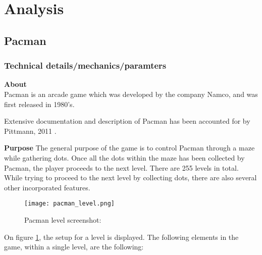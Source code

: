 
\section{Analysis} \label{sec:analysis}




\subsection{Pacman}

\subsubsection{Technical details/mechanics/paramters}

\textbf{About}\\
Pacman is an arcade game which was developed by the company Namco, and was first released in 1980's.

Extensive documentation and description of Pacman has been accounted for by Pittmann, 2011 \cite{Pittman2011}.

\textbf{Purpose}
The general purpose of the game is to control Pacman through a maze while gathering dots. Once all the dots within the maze has been collected by Pacman, the player proceeds to the next level. There are 255 levels in total.\\

While trying to proceed to the next level by collecting dots, there are also several other incorporated features.

\begin{figure}[!h]
\centering
\texttt{[image: pacman\_level.png]}
\caption{Pacman level screenshot: \cite{Pittman2011} }
\label{fig:Pacman}
\end{figure}


On figure \ref{fig:Pacman}, the setup for a level is displayed. The following elements in the game, within a single level, are the following:

